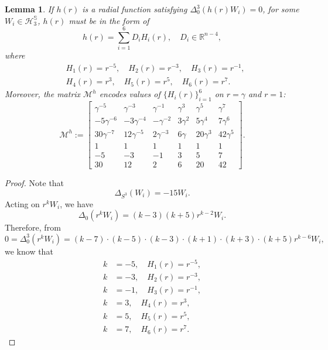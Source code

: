 \documentclass[11pt,letterpaper]{amsart}
\newcommand{\mM}{\mathcal{M}}
\newcommand{\bR}{\mathbb{R}}
\newcommand{\bS}{\mathbb{S}}
\newtheorem{lemma}[theorem]{Lemma}
\theoremstyle{definition}
\theoremstyle{remark}
\numberwithin{equation}{section}
\begin{document}
\begin{lemma}\label{h}
    If $h(r)$ is a radial function satisfying $\Delta_0^3 (h(r)W_i)=0$, for some $W_i\in \mathcal{H}^{\bS}_{3}$, $h(r)$ must be in the form of
    \begin{equation}
        h(r)=\sum_{i=1}^{6}D_i H_i(r), \quad D_i\in \bR^{n-4},
    \end{equation}
where
\begin{equation*}
    \begin{split}
        &H_1(r)=r^{-5}, \quad H_2(r)=r^{-3}, \quad H_3(r)=r^{-1},\\
        &H_4(r)=r^3, \quad H_5(r)=r^5, \quad H_6(r)=r^7.
    \end{split}
\end{equation*}
Moreover, the matrix $\mM^{h}$ encodes values of $\{H_i(r)\}_{i=1}^{6}$ on $r=\gamma$ and $r=1$:
\begin{equation}\label{Mh}
\mM^{h}:=\begin{bmatrix}
\gamma^{-5} & \gamma^{-3} &  \gamma^{-1} & \gamma^3 & \gamma^5& \gamma^7\\
-5\gamma^{-6} & -3\gamma^{-4} & -\gamma^{-2} & 3\gamma^2 & 5\gamma^4& 7\gamma^6\\
30\gamma^{-7} & 12\gamma^{-5} & 2\gamma^{-3} & 6\gamma & 20 \gamma^3& 42\gamma^5\\
1 & 1 & 1 & 1 & 1& 1\\
-5 & -3 & -1 & 3 & 5& 7\\
30 & 12 & 2 & 6 & 20& 42
\end{bmatrix}.
\end{equation}


\end{lemma}
\begin{proof}
    Note that
    \begin{equation*}
        \Delta_{S^3}(W_i)=-15W_i.
    \end{equation*}
Acting on $r^kW_i$, we have
\begin{equation*}
    \Delta_0 (r^kW_i)=(k-3)(k+5)r^{k-2}W_i.
\end{equation*}
Therefore, from
\begin{equation*}
    0=\Delta^3_0 (r^kW_i)=(k-7)\cdot (k-5)\cdot (k-3)\cdot (k+1)\cdot(k+3)\cdot(k+5)r^{k-6}W_i,
\end{equation*}
we know that
\begin{equation*}
    \begin{split}
        k&=-5, \quad H_1(r)=r^{-5},\\
        k&=-3, \quad H_2(r)=r^{-3},\\
        k&=-1, \quad H_3(r)=r^{-1},\\
        k&=3, \quad H_4(r)=r^3,\\
        k&=5, \quad H_5(r)=r^5,\\
        k&=7, \quad H_6(r)=r^7.
    \end{split}
\end{equation*}
\end{proof}
\end{document}
